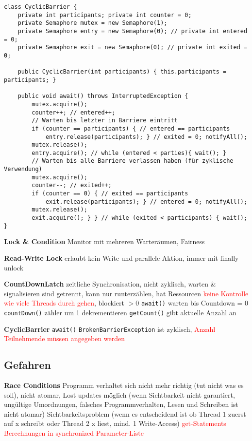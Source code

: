 \begin{lstlisting}
class CyclicBarrier {
    private int participants; private int counter = 0;
    private Semaphore mutex = new Semaphore(1);
    private Semaphore entry = new Semaphore(0); // private int entered = 0;
    private Semaphore exit = new Semaphore(0); // private int exited = 0;

    public CyclicBarrier(int participants) { this.participants = participants; }

    public void await() throws InterruptedException {
        mutex.acquire();
        counter++; // entered++;
        // Warten bis letzter in Barriere eintritt
        if (counter == participants) { // entered == participants
            entry.release(participants); } // exited = 0; notifyAll();
        mutex.release();
        entry.acquire(); // while (entered < parties){ wait(); }
        // Warten bis alle Barriere verlassen haben (für zyklische Verwendung)
        mutex.acquire();
        counter--; // exited++;
        if (counter == 0) { // exited == participants
            exit.release(participants); } // entered = 0; notifyAll();
        mutex.release();
        exit.acquire(); } } // while (exited < participants) { wait(); }
\end{lstlisting}

\textbf{Lock \& Condition} Monitor mit mehreren Warteräumen, Fairness

\textbf{Read-Write Lock} erlaubt kein Write und parallele Aktion, immer mit finally unlock

\textbf{CountDownLatch} zeitliche Synchronisation, nicht zyklisch, warten \& signalisieren sind getrennt, kann nur runterzählen, hat Ressourcen \textcolor{red}{keine Kontrolle wie viele Threads durch gehen}, blockiert $> 0$ \lstinline{await()} warten bis Countdown = 0 \lstinline{countDown()} zähler um 1 dekrementieren \lstinline{getCount()} gibt aktuelle Anzahl an

\textbf{CyclicBarrier} \lstinline{await()} \lstinline{BrokenBarrierException} ist zyklisch, \textcolor{red}{Anzahl Teilnehmende müssen angegeben werden}

\subsection{Gefahren}

\textbf{Race Conditions} Programm verhaltet sich nicht mehr richtig (tut nicht was es soll), nicht atomar, Lost updates möglich (wenn Sichtbarkeit nicht garantiert, ungültige Umordnungen, falsches Programmverhalten, Lesen und Schreiben ist nicht atomar) Sichtbarkeitsproblem (wenn es entscheidend ist ob Thread 1 zuerst auf x schreibt oder Thread 2 x liest, mind. 1 Write-Access) \textcolor{red}{get-Statements} \textcolor{red}{Berechnungen in synchronized Parameter-Liste}

